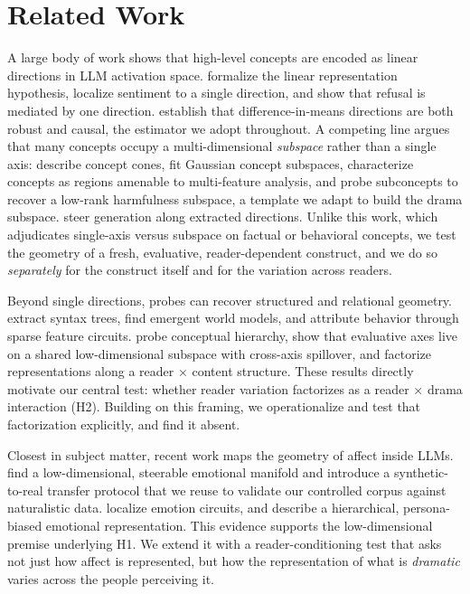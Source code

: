 \section{Related Work}\label{sec:related}

A large body of work shows that high-level concepts are encoded as linear directions in LLM activation space. \citet{park2023linear} formalize the linear representation hypothesis, \citet{tigges2023linear} localize sentiment to a single direction, and \citet{arditi2024refusal} show that refusal is mediated by one direction. \citet{marks2023geometry} establish that difference-in-means directions are both robust and causal, the estimator we adopt throughout. A competing line argues that many concepts occupy a multi-dimensional \emph{subspace} rather than a single axis: \citet{wollschlager2025geometry} describe concept cones, \citet{zhao2024gcs} fit Gaussian concept subspaces, \citet{shafran2026regions} characterize concepts as regions amenable to multi-feature analysis, and \citet{shah2025harmfulness} probe subconcepts to recover a low-rank harmfulness subspace, a template we adapt to build the drama subspace. \citet{subramani2022steering} steer generation along extracted directions. Unlike this work, which adjudicates single-axis versus subspace on factual or behavioral concepts, we test the geometry of a fresh, evaluative, reader-dependent construct, and we do so \emph{separately} for the construct itself and for the variation across readers.

Beyond single directions, probes can recover structured and relational geometry. \citet{hewitt2019structural} extract syntax trees, \citet{nanda2023emergent} find emergent world models, and \citet{marks2024sfc} attribute behavior through sparse feature circuits. \citet{dawes2026hprobes} probe conceptual hierarchy, \citet{kozlowski2026semantic} show that evaluative axes live on a shared low-dimensional subspace with cross-axis spillover, and \citet{lee2026tpr} factorize representations along a reader $\times$ content structure. These results directly motivate our central test: whether reader variation factorizes as a reader $\times$ drama interaction (H2). Building on this framing, we operationalize and test that factorization explicitly, and find it absent.

Closest in subject matter, recent work maps the geometry of affect inside LLMs. \citet{reichman2025emotions} find a low-dimensional, steerable emotional manifold and introduce a synthetic-to-real transfer protocol that we reuse to validate our controlled corpus against naturalistic data. \citet{wang2025emotion} localize emotion circuits, and \citet{zhao2025hierarchical} describe a hierarchical, persona-biased emotional representation. This evidence supports the low-dimensional premise underlying H1. We extend it with a reader-conditioning test that asks not just how affect is represented, but how the representation of what is \emph{dramatic} varies across the people perceiving it.

